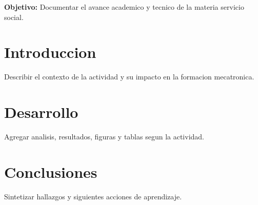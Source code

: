 \documentclass[spanish,letterpaper,oneside]{article}
\begin{document}
\templatePortrait
\templatePagecfg
\onehalfspacing

\begin{abstractd}
\textbf{Objetivo:} Documentar el avance academico y tecnico de la materia servicio social.
\end{abstractd}

\templateIndex
\templateFinalcfg

\section{Introduccion}
Describir el contexto de la actividad y su impacto en la formacion mecatronica.

\section{Desarrollo}
Agregar analisis, resultados, figuras y tablas segun la actividad.

\section{Conclusiones}
Sintetizar hallazgos y siguientes acciones de aprendizaje.



\end{document}
